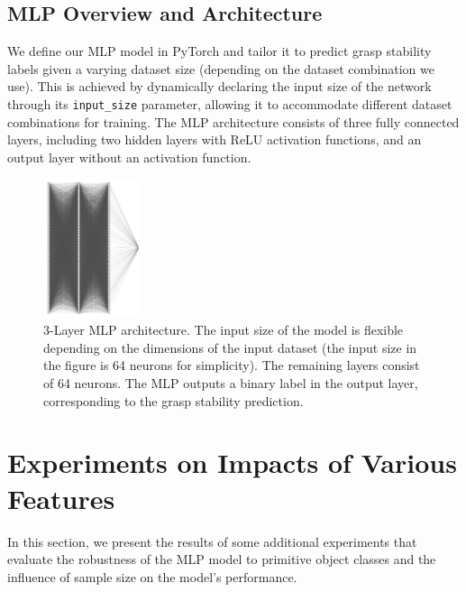 \documentclass[11pt, a4paper]{report}
\begin{document}
\subsection{MLP Overview and Architecture}\label{sec:5.2.5}
We define our MLP model in PyTorch and tailor it to predict grasp stability labels given a varying dataset size (depending on the dataset combination we use). This is achieved by dynamically declaring the input size of the network through its \verb|input_size| parameter, allowing it to accommodate different dataset combinations for training. The MLP architecture consists of three fully connected layers, including two hidden layers with ReLU activation functions, and an output layer without an activation function.
\vspace{-0.2cm}
\begin{figure}[H]
    \centering
    \includegraphics[width=0.25\textwidth]{docs/Project Report/Media/5_2_5_mlp_architecture.png}
    \caption{3-Layer MLP architecture. The input size of the model is flexible depending on the dimensions of the input dataset (the input size in the figure is 64 neurons for simplicity). The remaining layers consist of 64 neurons. The MLP outputs a binary label in the output layer, corresponding to the grasp stability prediction.}
    \label{fig:5.3}
\end{figure}


\section{Experiments on Impacts of Various Features}\label{sec:5.3}
In this section, we present the results of some additional experiments that evaluate the robustness of the MLP model to primitive object classes and the influence of sample size on the model's performance.
\end{document}
